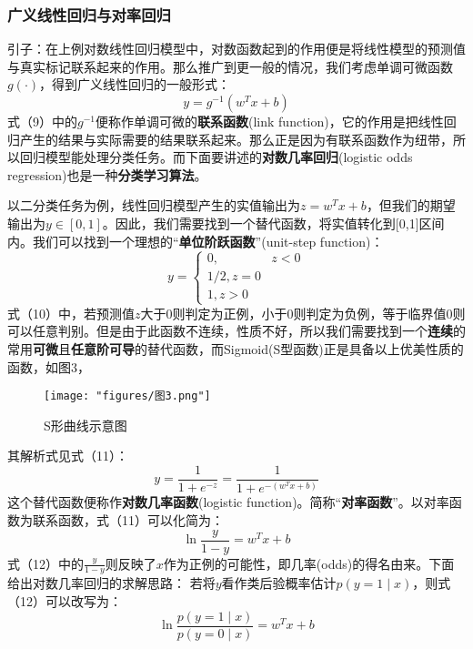 \subsubsection{广义线性回归与对率回归}
引子：在上例对数线性回归模型中，对数函数起到的作用便是将线性模型的预测值与真实标记联系起来的作用。那么推广到更一般的情况，我们考虑单调可微函数$g(\cdot)$，得到广义线性回归的一般形式：
\begin{equation}y=g^{-1}(w^Tx+b)\end{equation}
式（9）中的$g^{-1}$便称作单调可微的\textbf{联系函数}(link function)，它的作用是把线性回归产生的结果与实际需要的结果联系起来。那么正是因为有联系函数作为纽带，所以回归模型能处理分类任务。而下面要讲述的\textbf{对数几率回归}(logistic odds regression)也是一种\textbf{分类学习算法}。

以二分类任务为例，线性回归模型产生的实值输出为$z=w^Tx+b$，但我们的期望输出为$y\in[0,1]$。因此，我们需要找到一个替代函数，将实值转化到[0,1]区间内。我们可以找到一个理想的“\textbf{单位阶跃函数}”(unit-step function)：
\begin{equation}y=\begin{cases}0,&z<0\\1/2,z=0\\1,z>0&\end{cases}\end{equation}
式（10）中，若预测值$z$大于0则判定为正例，小于0则判定为负例，等于临界值0则可以任意判别。但是由于此函数不连续，性质不好，所以我们需要找到一个\textbf{连续}的常用\textbf{可微}且\textbf{任意阶可导}的替代函数，而Sigmoid(S型函数)正是具备以上优美性质的函数，如图3，
\begin{figure}[ht] 
	\centering
	\texttt{[image: "figures/图3.png"]} %
	\caption{S形曲线示意图} %
	\label{fig:example} %
\end{figure}
其解析式见式（11）：
\begin{equation}y=\frac1{1+e^{-z}}=\frac1{1+e^{-(w^Tx+b)}}\end{equation}
这个替代函数便称作\textbf{对数几率函数}(logistic function)。简称“\textbf{对率函数}”。以对率函数为联系函数，式（11）可以化简为：
\begin{equation}\ln\frac y{1-y}=w^Tx+b\end{equation}
式（12）中的$\frac y{1-y}$则反映了$x$作为正例的可能性，即几率(odds)的得名由来。下面给出对数几率回归的求解思路：
若将$y$看作类后验概率估计$p(y=1\mid x)$，则式（12）可以改写为：
\begin{equation}\ln\frac{p(y=1\mid x)}{p(y=0\mid x)}=w^Tx+b\end{equation}
